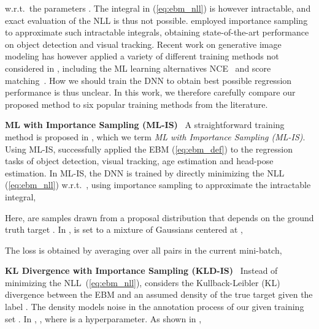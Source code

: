 \documentclass{bmvc2k}
\newcommand{\parsection}[1]{\vspace{2mm}\noindent\textbf{#1}~ }
\begin{document}
w.r.t.\ the parameters . The integral in (\ref{eq:ebm_nll}) is however intractable, and exact evaluation of the NLL is thus not possible. \cite{gustafsson2019learning,danelljan2020probabilistic} employed importance sampling to approximate such intractable integrals, obtaining state-of-the-art performance on object detection and visual tracking. Recent work \cite{gao2019flow, saremi2018deep, li2019annealed, du2019implicit, nijkamp2019anatomy, Grathwohl2020Your} on generative image modeling has however applied a variety of different training methods not considered in \cite{gustafsson2019learning,danelljan2020probabilistic}, including the ML learning alternatives NCE~\cite{gutmann2010noise} and score matching~\cite{hyvarinen2005estimation}. How we should train the DNN  to obtain best possible regression performance is thus unclear. In this work, we therefore carefully compare our proposed method to six popular training methods from the literature.








\parsection{ML with Importance Sampling (ML-IS)}
A straightforward training method is proposed in \cite{gustafsson2019learning}, which we term \textit{ML with Importance Sampling (ML-IS)}. Using ML-IS, \cite{gustafsson2019learning} successfully applied the EBM (\ref{eq:ebm_def}) to the regression tasks of object detection, visual tracking, age estimation and head-pose estimation. In ML-IS, the DNN  is trained by directly minimizing the NLL (\ref{eq:ebm_nll}) w.r.t.\ , using importance sampling to approximate the intractable integral,

Here,  are  samples drawn from a proposal distribution  that depends on the ground truth target . In \cite{gustafsson2019learning},  is set to a mixture of  Gaussians centered at ,

The loss  is obtained by averaging over all pairs  in the current mini-batch,









\parsection{KL Divergence with Importance Sampling (KLD-IS)}
Instead of minimizing the NLL~(\ref{eq:ebm_nll}), \cite{danelljan2020probabilistic} considers the Kullback-Leibler (KL) divergence  between the EBM  and an assumed density  of the true target  given the label . The density  models noise in the annotation process of our given training set . In \cite{danelljan2020probabilistic}, , where  is a hyperparameter. As shown in \cite{danelljan2020probabilistic},
\end{document}
